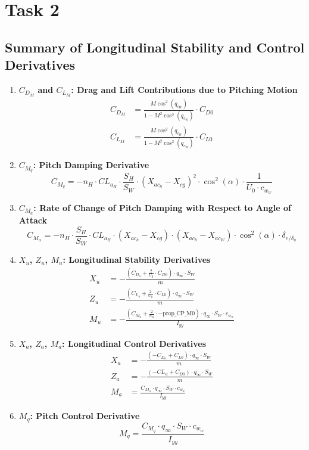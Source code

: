\documentclass[a4paper, twoside]{article}
\begin{document}
\section{Task 2}

\subsection*{Summary of Longitudinal Stability and Control Derivatives}

\begin{enumerate}

\item \textbf{\(C_{D_M}\) and \(C_{L_M}\): Drag and Lift Contributions due to Pitching Motion}
\begin{align*}
C_{D_M} &= \frac{M \cos^2(q_{c_W})}{1 - M^2 \cos^2(q_{c_W})} \cdot C_{D0} \\
C_{L_M} &= \frac{M \cos^2(q_{c_W})}{1 - M^2 \cos^2(q_{c_W})} \cdot C_{L0}
\end{align*}

\item \textbf{\(C_{M_q}\): Pitch Damping Derivative}
\[
C_{M_q} = -n_H \cdot CL_{a_H} \cdot \frac{S_H}{S_W} \cdot (X_{ac_h} - X_{cg})^2 \cdot \cos^2(\alpha) \cdot \frac{1}{U_0 \cdot c_{w_w}}
\]

\item \textbf{\(C_{M_{\dot{a}}}\): Rate of Change of Pitch Damping with Respect to Angle of Attack}
\begin{equation*}
C_{M_{\dot{\alpha}}} = -n_H \cdot \frac{S_H}{S_W} \cdot CL_{a_H} \cdot (X_{ac_h} - X_{cg}) \cdot (X_{ac_h} - X_{ac_W}) \cdot \cos^2(\alpha) \cdot \delta_{e/\delta_{a}}
\end{equation*}

\item \textbf{\(X_u\), \(Z_u\), \(M_u\): Longitudinal Stability Derivatives}
\begin{align*}
X_u &= -\frac{(C_{D_u} + \frac{2}{U_0} \cdot C_{D0}) \cdot q_{\infty} \cdot S_W}{m} \\
Z_u &= -\frac{(C_{L_u} + \frac{2}{U_0} \cdot C_{L0}) \cdot q_{\infty} \cdot S_W}{m} \\
M_u &= -\frac{(C_{M_u} + \frac{2}{U_0} \cdot -\text{{prop\_CP\_M0}}) \cdot q_{\infty} \cdot S_W \cdot c_{w_w}}{I_{yy}}
\end{align*}

\item \textbf{\(X_a\), \(Z_a\), \(M_a\): Longitudinal Control Derivatives}
\begin{align*}
X_a &= -\frac{(-C_{D_{\alpha}} + C_{L0}) \cdot q_{\infty} \cdot S_W}{m} \\
Z_a &= -\frac{(-CL_{\alpha} + C_{D0}) \cdot q_{\infty} \cdot S_W}{m} \\
M_a &= \frac{C_{M_{\alpha}} \cdot q_{\infty} \cdot S_W \cdot c_{w_w}}{I_{yy}}
\end{align*}

\item \textbf{\(M_q\): Pitch Control Derivative}
\[
M_q = \frac{C_{M_q} \cdot q_{\infty} \cdot S_W \cdot c_{w_w}}{I_{yy}}
\]

\end{enumerate}
\end{document}
